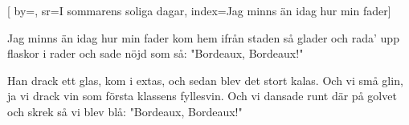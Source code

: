 


[ 		%
	by={},					%
	sr={I sommarens soliga dagar},					%
	index={Jag minns än idag hur min fader}]						%
	
\beginverse*						%
Jag minns än idag hur min fader 
kom hem ifrån staden så glader
och rada' upp flaskor i rader 
och sade nöjd som så: "Bordeaux, Bordeaux!"
\endverse							%

\beginchorus						%
Han drack ett glas, kom i extas, 
och sedan blev det stort kalas. 
Och vi små glin, ja vi drack vin
som första klassens fyllesvin.
Och vi dansade runt där på golvet
och skrek så vi blev blå:
"Bordeaux, Bordeaux!"
\endchorus							%

\endsong							%